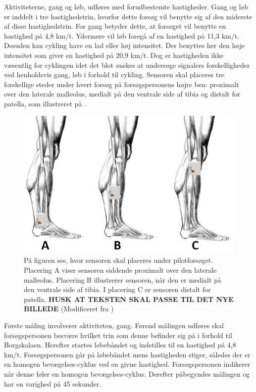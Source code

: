 Aktiviteterne, gang og løb, udføres med forudbestemte hastigheder. \newline
Gang og løb er inddelt i tre hastighedstrin, hvorfor dette forsøg vil benytte sig af den miderste af disse hastighedstrin. For gang betyder dette, at forsøget vil benytte en hastighed på 4,8 km/t. Ydermere vil løb foregå af en hastighed på 11,3 km/t. Desuden kan cykling have en lad eller høj intensitet. Der benyttes her den høje intensitet som giver en hastighed på 20,9 km/t. Dog er hastigheden ikke væsentlig for cyklingen idet det blot ønskes at undersøge signalers forskelligheder ved henholdsvis gang, løb i forhold til cykling. \citep{Miles 2007} \newline
Sensoren skal placeres tre forskellige steder under hvert forsøg på forsøgspersonens højre ben: proximalt over den laterale malleolus, medialt på den ventrale side af tibia og distalt for patella, som illustreret på .
\begin{figure}[H]
	\centering
	\includegraphics[scale=0.6]{figures/qBilag/Sensor_placering2.png}
	\caption{På figuren ses, hvor sensoren skal placeres under pilotforsøget. Placering A viser sensoren siddende proximalt over den laterale malleolus. Placering B illustrerer sensoren, når den er medialt på den ventrale side af tibia. I placering C er sensoren distalt for patella. \textbf{HUSK AT TEKSTEN SKAL PASSE TIL DET NYE BILLEDE} (Modificeret fra \cite{Perna2016,Shimmer2016})}
	\label{fig:sensor_placering}
\end{figure}


Første måling involverer aktiviteten, gang. Førend målingen udføres skal forsøgspersonen besvære hvilket trin som denne befinder sig på i forhold til Borgskalaen. Herefter startes løbebåndet og indstilles til en hastighed på 4,8 km/t. Forsøgspersonen går på løbebåndet mens hastigheden stiger, således der er en homogen bevægelses-cyklus ved en givne hastighed. Forsøgspersonen indikerer når denne føler en homogen bevægelses-cyklus. Derefter påbegyndes målingen og har en varighed på 45 sekunder. 

